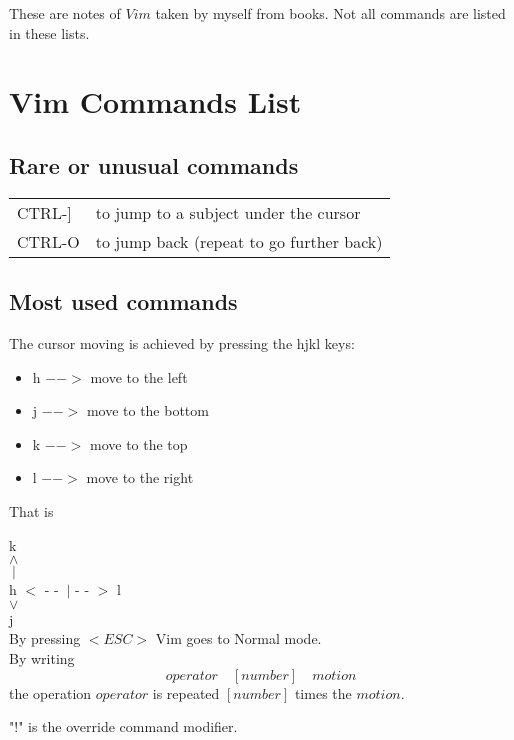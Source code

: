 \documentclass[11p]{book}
\begin{document}
These are notes of $Vim$ taken by myself from books. Not all commands are listed in these lists.
\chapter*{Vim Commands List}
\newpage

\section*{Rare or unusual commands}
\begin{tabular}{p{4cm} l}
CTRL-] & to jump to a subject under the cursor\\
CTRL-O & to jump back (repeat to go further back)\\
\hline
\end{tabular}
\newpage

\section*{Most used commands}
The cursor moving is achieved by pressing the hjkl keys:
\begin{itemize}
\item h $-->$ move to the left
\item j $-->$ move to the bottom
\item k $-->$ move to the top
\item l $-->$ move to the right
\end{itemize}

That is

\hspace*{8cm}k \\
\hspace*{8.5cm}$\wedge$\\
\hspace*{8.5cm}$\>|$\\
\hspace*{7.32cm}h $<$ - - $\>|$ - - $>$ l \\
\hspace*{8.5cm}$\vee$ \\
\hspace*{8.6cm}j \\

By pressing $<ESC>$ Vim goes to Normal mode. \\

By writing $$operator \quad [number] \quad motion$$ the operation $operator$ is repeated $[number]$ times the $motion$. 

"$!$" \hspace*{0.1cm} is the override command modifier.
\end{document}
